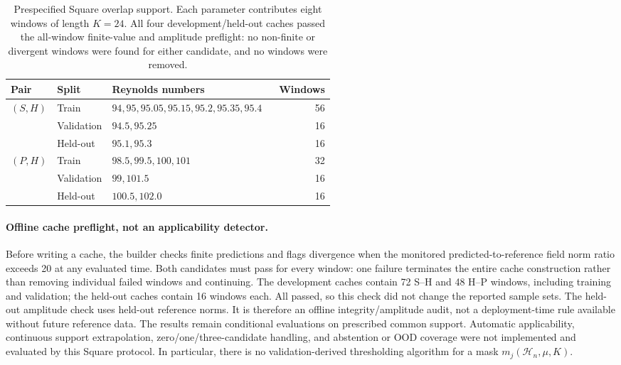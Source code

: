 \begin{table}[t]
\centering
\small
\setlength{\tabcolsep}{4pt}
\caption{Prespecified Square overlap support. Each parameter contributes
eight windows of length $K=24$. All four development/held-out caches
passed the all-window finite-value and amplitude preflight:
no non-finite or divergent windows were found for either candidate,
and no windows were removed.}
\label{tab:outer_candidate_support}
\begin{tabular}{@{}llp{0.53\linewidth}r@{}}
\toprule
Pair & Split & Reynolds numbers & Windows\\
\midrule
$(S,H)$ & Train & $94,95,95.05,95.15,95.2,95.35,95.4$ & 56\\
& Validation & $94.5,95.25$ & 16\\
& Held-out & $95.1,95.3$ & 16\\
\addlinespace
$(P,H)$ & Train & $98.5,99.5,100,101$ & 32\\
& Validation & $99,101.5$ & 16\\
& Held-out & $100.5,102.0$ & 16\\
\bottomrule
\end{tabular}
\end{table}

\paragraph{Offline cache preflight, not an applicability detector.}
Before writing a cache, the builder checks finite predictions and
flags divergence when the monitored predicted-to-reference field
norm ratio exceeds 20 at any evaluated time. Both candidates must
pass for every window: one failure terminates the entire cache
construction rather than removing individual failed windows and
continuing. The development caches contain 72 S--H and 48 H--P
windows, including training and validation; the held-out caches
contain 16 windows each. All passed, so this check did not change
the reported sample sets.
The held-out amplitude check uses held-out reference norms.
It is therefore an offline integrity/amplitude audit, not a
deployment-time rule available without future reference data.
The results remain conditional evaluations on prescribed common
support. Automatic applicability, continuous support extrapolation,
zero/one/three-candidate handling, and abstention or OOD coverage
were not implemented and evaluated by this Square protocol.
In particular, there is no validation-derived thresholding algorithm
for a mask $m_j(\mathcal H_n,\mu,K)$.

